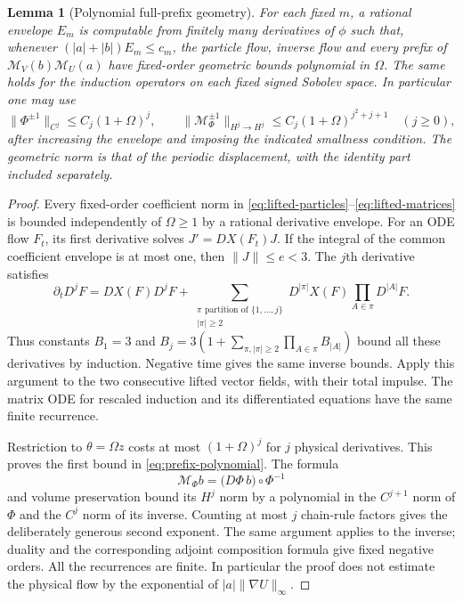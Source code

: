 \documentclass[11pt,a4paper]{amsart}
\newtheorem{lemma}[theorem]{Lemma}
\theoremstyle{definition}
\theoremstyle{remark}
\numberwithin{equation}{section}
\newcommand{\Mcal}{\mathcal M}
\newcommand{\norm}[1]{\lVert #1\rVert}
\begin{document}
\begin{lemma}[Polynomial full-prefix geometry]\label{lem:packet-geometry}
For each fixed $m$, a rational envelope $E_m$ is computable from finitely many
derivatives of $\phi$ such that, whenever
$(|a|+|b|)E_m\le c_m$, the particle flow, inverse flow and every prefix of
$\Mcal_V(b)\Mcal_U(a)$ have fixed-order geometric bounds polynomial in $\Omega$.
The same holds for the induction operators on each fixed signed Sobolev
space.  In particular one may use
\begin{equation}\label{eq:prefix-polynomial}
 \norm{\Phi^{\pm1}}_{C^j}\le C_j(1+\Omega)^j,
 \qquad
 \norm{\Mcal_\Phi^{\pm1}}_{H^j\to H^j}
        \le C_j(1+\Omega)^{j^2+j+1}\quad(j\ge0),
\end{equation}
after increasing the envelope and imposing the indicated smallness condition.
The geometric norm is that of the periodic displacement, with the identity
part included separately.
\end{lemma}

\begin{proof}
Every fixed-order coefficient norm in
\eqref{eq:lifted-particles}--\eqref{eq:lifted-matrices} is bounded independently
of $\Omega\ge1$ by a rational derivative envelope.  For an ODE flow $F_t$, its first
derivative solves $J'=DX(F_t)J$.  If the integral of the common coefficient
envelope is at most one, then $\norm J\le e<3$.  The $j$th derivative satisfies
\[
 \partial_tD^jF=DX(F)D^jF+
  \sum_{\substack{\pi\text{ partition of }\{1,\ldots,j\}\\|\pi|\ge2}}
  D^{|\pi|}X(F)\prod_{A\in\pi}D^{|A|}F.
\]
Thus constants $B_1=3$ and
$B_j=3(1+\sum_{\pi,|\pi|\ge2}\prod_{A\in\pi}B_{|A|})$ bound all these
derivatives by induction.  Negative time gives the same inverse bounds.
Apply this argument to the two consecutive lifted vector fields, with their
total impulse.  The matrix ODE for rescaled induction and its differentiated
equations have the same finite recurrence.

Restriction to $\theta=\Omega z$ costs at most $(1+\Omega)^j$ for $j$ physical
derivatives.  This proves the first bound in \eqref{eq:prefix-polynomial}.
The formula
\[
 \Mcal_\Phi b=\bigl(D\Phi\,b\bigr)\circ\Phi^{-1}
\]
and volume preservation bound its $H^j$ norm by a polynomial in the
$C^{j+1}$ norm of $\Phi$ and the $C^j$ norm of its inverse.  Counting at most
$j$ chain-rule factors gives the deliberately generous second exponent.
The same argument applies to the inverse; duality and the corresponding
adjoint composition formula give fixed negative orders.  All the recurrences
are finite.  In particular the proof does not estimate the physical flow by
the exponential of $|a|\norm{\nabla U}_\infty$.
\end{proof}
\end{document}
